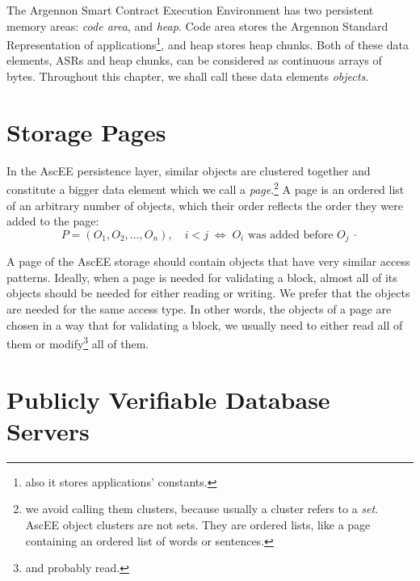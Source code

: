 
The Argennon Smart Contract Execution Environment has two persistent memory areas: \emph{code area}, and \emph{heap}.
Code area stores the Argennon Standard Representation of
applications\footnote{also it stores applications' constants.}, and heap stores heap chunks.
Both of these data elements, ASRs and heap chunks, can be considered as continuous arrays of bytes.
Throughout this chapter, we shall call these data elements \emph{objects}.


\section{Storage Pages}\label{sec:storage-pages}

In the AscEE persistence layer, similar objects are clustered together and constitute a bigger data element which we
call
a \emph{page}.\footnote{we avoid calling them clusters, because usually a cluster refers to a \emph{set}. AscEE object
clusters are not sets. They are ordered lists, like a page containing an ordered list of words or sentences.}
A page is an ordered list of an arbitrary number of objects, which their order reflects the order they were added to
the page:
\[
    P = (O_1,O_2,\dots,O_n),\quad i < j \; \Leftrightarrow \; \textrm{$O_i$ was added before $O_j$}\ \cdot
\]

A page of the AscEE storage should contain objects that have very similar access patterns. Ideally, when a page is needed
for validating a block, almost all of its objects should be needed for either reading or writing. We prefer
that the objects are needed for the same access type. In other words, the objects of a page are chosen in a way that
for validating a block, we usually need to either read all of them or modify\footnote{and probably read.} all of them.


\section{Publicly Verifiable Database Servers}\label{sec:zk-edb}

